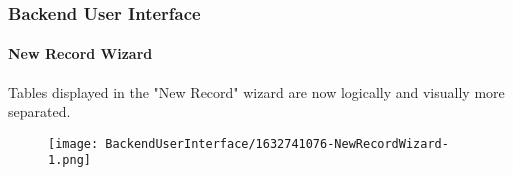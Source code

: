 %

\begin{frame}[fragile]
	\frametitle{Backend User Interface}
	\framesubtitle{New Record Wizard}

	Tables displayed in the "New Record" wizard are now logically and visually
	more separated.

	\begin{figure}
		\texttt{[image: BackendUserInterface/1632741076-NewRecordWizard-1.png]}
	\end{figure}

\end{frame}

